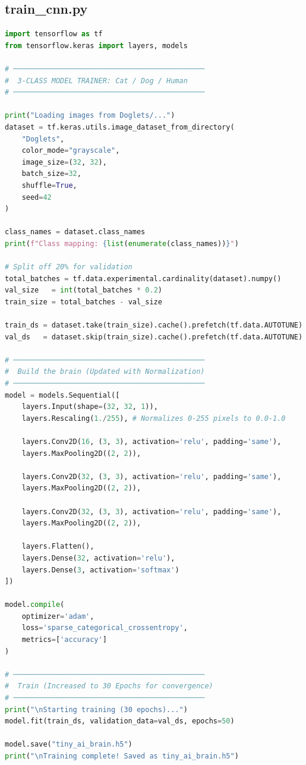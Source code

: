 
\subsection{train_cnn.py}
\begin{lstlisting}[language=Python]
import tensorflow as tf
from tensorflow.keras import layers, models

# ─────────────────────────────────────────────
#  3-CLASS MODEL TRAINER: Cat / Dog / Human
# ─────────────────────────────────────────────

print("Loading images from Doglets/...")
dataset = tf.keras.utils.image_dataset_from_directory(
    "Doglets",
    color_mode="grayscale",
    image_size=(32, 32),
    batch_size=32,
    shuffle=True,
    seed=42
)

class_names = dataset.class_names
print(f"Class mapping: {list(enumerate(class_names))}")

# Split off 20% for validation
total_batches = tf.data.experimental.cardinality(dataset).numpy()
val_size   = int(total_batches * 0.2)
train_size = total_batches - val_size

train_ds = dataset.take(train_size).cache().prefetch(tf.data.AUTOTUNE)
val_ds   = dataset.skip(train_size).cache().prefetch(tf.data.AUTOTUNE)

# ─────────────────────────────────────────────
#  Build the brain (Updated with Normalization)
# ─────────────────────────────────────────────
model = models.Sequential([
    layers.Input(shape=(32, 32, 1)),
    layers.Rescaling(1./255), # Normalizes 0-255 pixels to 0.0-1.0
    
    layers.Conv2D(16, (3, 3), activation='relu', padding='same'),
    layers.MaxPooling2D((2, 2)),
    
    layers.Conv2D(32, (3, 3), activation='relu', padding='same'),
    layers.MaxPooling2D((2, 2)),
    
    layers.Conv2D(32, (3, 3), activation='relu', padding='same'),
    layers.MaxPooling2D((2, 2)),
    
    layers.Flatten(),
    layers.Dense(32, activation='relu'),
    layers.Dense(3, activation='softmax')
])

model.compile(
    optimizer='adam',
    loss='sparse_categorical_crossentropy',
    metrics=['accuracy']
)

# ─────────────────────────────────────────────
#  Train (Increased to 30 Epochs for convergence)
# ─────────────────────────────────────────────
print("\nStarting training (30 epochs)...")
model.fit(train_ds, validation_data=val_ds, epochs=50)

model.save("tiny_ai_brain.h5")
print("\nTraining complete! Saved as tiny_ai_brain.h5")
\end{lstlisting}

